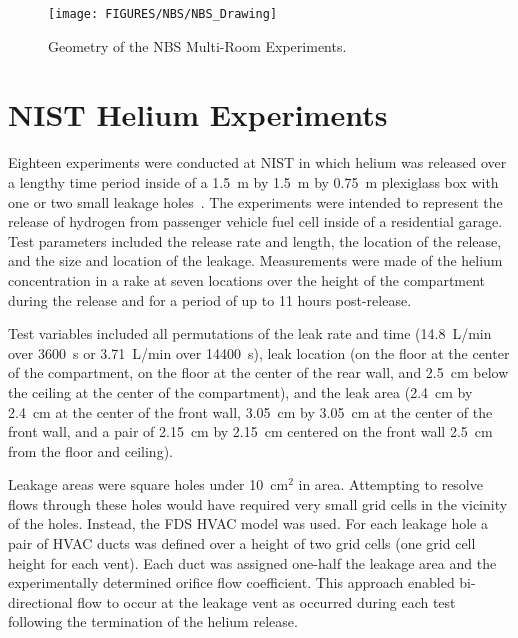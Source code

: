 \begin{figure}
\begin{center}
\texttt{[image: FIGURES/NBS/NBS\_Drawing]}
\end{center}
\caption[Geometry of the NBS Multi-Room Experiments]{Geometry of the NBS Multi-Room Experiments.}
\label{NBS_Drawing}
\end{figure}





\clearpage

\section{NIST Helium Experiments}

Eighteen experiments were conducted at NIST in which helium was released over a lengthy time period inside of a 1.5~m by 1.5~m by 0.75~m plexiglass box with one or two small leakage holes~\cite{Pitts:2011}. The experiments were intended to represent the release of hydrogen from passenger vehicle fuel cell inside of a residential garage. Test parameters included the release rate and length, the location of the release, and the size and location of the leakage. Measurements were made of the helium concentration in a rake at seven locations over the height of the compartment during the release and for a period of up to 11 hours post-release.

Test variables included all permutations of the leak rate and time (14.8~L/min over 3600~s or 3.71~L/min over 14400~s), leak location (on the floor at the center of the compartment, on the floor at the center of the rear wall, and 2.5~cm below the ceiling at the center of the compartment), and the leak area (2.4~cm by 2.4~cm at the center of the front wall, 3.05~cm by 3.05~cm at the center of the front wall, and a pair of 2.15~cm by 2.15~cm centered on the front wall 2.5~cm from the floor and ceiling).

Leakage areas were square holes under 10~cm$^2$ in area.  Attempting to resolve flows through these holes would have required very small grid cells in the vicinity of the holes.  Instead, the FDS HVAC model was used.  For each leakage hole a pair of HVAC ducts was defined over a height of two grid cells (one grid cell height for each vent).  Each duct was assigned one-half the leakage area and the experimentally determined orifice flow coefficient. This approach enabled bi-directional flow to occur at the leakage vent as occurred during each test following the termination of the helium release.



